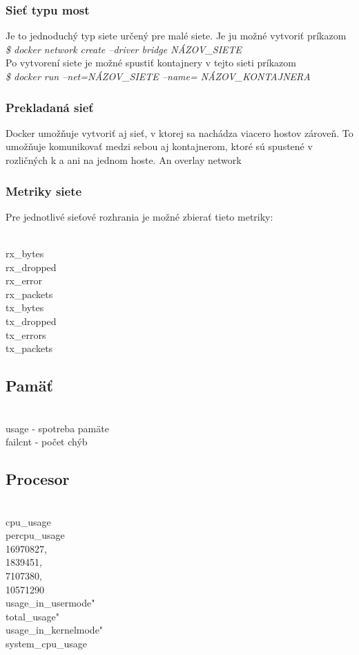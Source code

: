 \documentclass[11pt,final,oneside]{fithesis}
\begin{document}
\subsubsection{Sieť typu most}
Je to jednoduchý typ siete určený pre malé siete. Je ju možné vytvoriť príkazom 
\\
{\em \$ docker network create --driver bridge NÁZOV_SIETE }
\\
Po vytvorení siete je možné spustiť kontajnery v tejto sieti príkazom
\\
{\em \$ docker run --net=NÁZOV_SIETE --name= NÁZOV_KONTAJNERA}
\\

\subsubsection{Prekladaná sieť}
Docker umožňuje vytvoriť aj sieť, v ktorej sa nachádza viacero hostov zároveň. To umožňuje komunikovať medzi sebou aj kontajnerom,
ktoré sú spustené v rozličných k a ani na jednom hoste.
An overlay network

\subsubsection{Metriky siete}
Pre jednotlivé sieťové rozhrania je možné zbierať tieto metriky:

\\    rx_bytes
\\    rx_dropped
\\    rx_error
\\    rx_packets
\\    tx_bytes
\\    tx_dropped
\\    tx_errors
\\    tx_packets

\subsection{Pamäť}
\\        usage - spotreba pamäte
\\        failcnt - počet chýb

\subsection{Procesor}
\\        cpu_usage 
\\           percpu_usage
\\              16970827,
\\              1839451,
\\              7107380,
\\              10571290
\\           usage_in_usermode"
\\           total_usage" 
\\           usage_in_kernelmode" 
\\        system_cpu_usage
\end{document}
